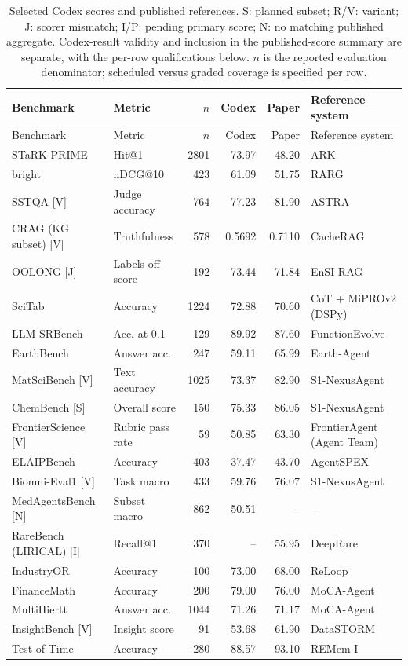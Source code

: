 \begingroup
\scriptsize
\setlength{\tabcolsep}{3pt}
\begin{longtable}{@{}p{}p{}rrrp{}@{}}
\caption{Selected Codex scores and published references. S: planned subset; R/V: variant;
J: scorer mismatch; I/P: pending primary score; N: no matching published aggregate.
Codex-result validity and inclusion in the published-score summary are separate, with the per-row
qualifications below. $n$ is the reported evaluation denominator; scheduled versus graded
coverage is specified per row.}
\label{tab:all-results}\\
\toprule
Benchmark & Metric & $n$ & Codex & Paper & Reference system \\
\midrule
\endfirsthead
\toprule
Benchmark & Metric & $n$ & Codex & Paper & Reference system \\
\midrule
\endhead
\bottomrule
\endfoot
STaRK-PRIME & Hit@1 & 2801 & 73.97 & 48.20 & ARK \\
bright & nDCG@10 & 423 & 61.09 & 51.75 & RARG \\
SSTQA [V] & Judge accuracy & 764 & 77.23 & 81.90 & ASTRA \\
CRAG (KG subset) [V] & Truthfulness & 578 & 0.5692 & 0.7110 & CacheRAG \\
OOLONG [J] & Labels-off score & 192 & 73.44 & 71.84 & EnSI-RAG \\
SciTab & Accuracy & 1224 & 72.88 & 70.60 & CoT + MiPROv2 (DSPy) \\
LLM-SRBench & Acc. at 0.1 & 129 & 89.92 & 87.60 & FunctionEvolve \\
EarthBench & Answer acc. & 247 & 59.11 & 65.99 & Earth-Agent \\
MatSciBench [V] & Text accuracy & 1025 & 73.37 & 82.90 & S1-NexusAgent \\
ChemBench [S] & Overall score & 150 & 75.33 & 86.05 & S1-NexusAgent \\
FrontierScience [V] & Rubric pass rate & 59 & 50.85 & 63.30 & FrontierAgent (Agent Team) \\
ELAIPBench & Accuracy & 403 & 37.47 & 43.70 & AgentSPEX \\
Biomni-Eval1 [V] & Task macro & 433 & 59.76 & 76.07 & S1-NexusAgent \\
MedAgentsBench [N] & Subset macro & 862 & 50.51 & -- & -- \\
RareBench (LIRICAL) [I] & Recall@1 & 370 & -- & 55.95 & DeepRare \\
IndustryOR & Accuracy & 100 & 73.00 & 68.00 & ReLoop \\
FinanceMath & Accuracy & 200 & 79.00 & 76.00 & MoCA-Agent \\
MultiHiertt & Answer acc. & 1044 & 71.26 & 71.17 & MoCA-Agent \\
InsightBench [V] & Insight score & 91 & 53.68 & 61.90 & DataSTORM \\
Test of Time & Accuracy & 280 & 88.57 & 93.10 & REMem-I \\
\end{longtable}
\endgroup

